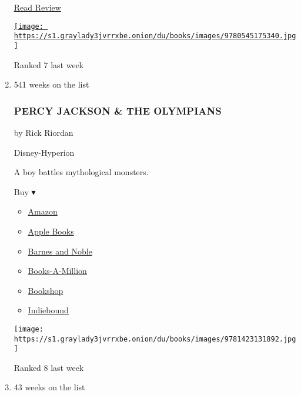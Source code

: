 \begin{enumerate}
  \href{https://www.nytimes3xbfgragh.onion/2011/06/29/books/review/childrens-books-super-diaper-baby-2-by-dav-pilkey.html}{Read
  Review}

  \href{https://www.nytimes3xbfgragh.onion/2011/06/29/books/review/childrens-books-super-diaper-baby-2-by-dav-pilkey.html}{\texttt{[image: https://s1.graylady3jvrrxbe.onion/du/books/images/9780545175340.jpg]}}

  Ranked 7 last week
\item
  541 weeks on the list

  \hypertarget{percy-jackson--the-olympians}{%
  \subsubsection{PERCY JACKSON \& THE
  OLYMPIANS}\label{percy-jackson--the-olympians}}

  by Rick Riordan

  Disney-Hyperion

  A boy battles mythological monsters.

  Buy ▾

  \begin{itemize}
  \tightlist
  \item
    \href{http://www.amazon.com/Titans-Curse-Percy-Jackson-Olympians/dp/1423101480?tag=NYTBS-20}{Amazon}
  \item
    \href{https://du-gae-books-dot-nyt-du-prd.appspot.com/buy?title=PERCY+JACKSON+\%26+THE+OLYMPIANS\&author=Rick+Riordan}{Apple
    Books}
  \item
    \href{https://www.anrdoezrs.net/click-7990613-11819508?url=https\%3A\%2F\%2Fwww.barnesandnoble.com\%2Fw\%2F\%3Fean\%3D9780786838653}{Barnes
    and Noble}
  \item
    \href{https://www.anrdoezrs.net/click-7990613-35140?url=https\%3A\%2F\%2Fwww.booksamillion.com\%2Fp\%2FPERCY\%2BJACKSON\%2B\%2526\%2BTHE\%2BOLYMPIANS\%2FRick\%2BRiordan\%2F9780786838653}{Books-A-Million}
  \item
    \href{https://bookshop.org/a/3546/9780786838653}{Bookshop}
  \item
    \href{https://www.indiebound.org/book/9780786838653?aff=NYT}{Indiebound}
  \end{itemize}

  \texttt{[image: https://s1.graylady3jvrrxbe.onion/du/books/images/9781423131892.jpg]}

  Ranked 8 last week
\item
  43 weeks on the list


\end{enumerate}
